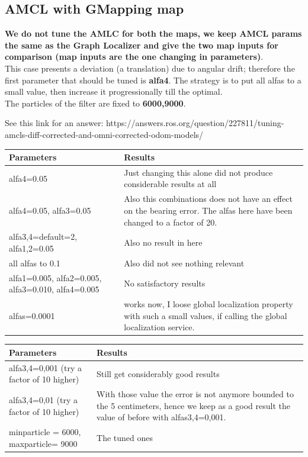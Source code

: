 \documentclass[11pt,a4paper]{article}
\begin{document}
\subsection{AMCL with GMapping map}

\textbf{We do not tune the AMLC for both the maps, we keep AMCL params the same as the Graph Localizer and give the two map inputs for comparison (map inputs are the one changing in parameters)}. \\

This case presents a deviation (a translation) due to angular drift; therefore the first parameter that should be tuned is \textbf{alfa4}. The strategy is to put all alfas to a small value, then increase it progressionally till the optimal. \\
The particles of the filter are fixed to \textbf{6000,9000}.

See this link for an answer: https://answers.ros.org/question/227811/tuning-amcls-diff-corrected-and-omni-corrected-odom-models/

\begin{center}
\begin{tabular}{| m{12em} | m{13em}|} 
\hline
\textbf{Parameters} & \textbf{Results} \\
\hline
 alfa4=0.05 &  Just changing this alone did not produce considerable results at all\\
\hline
 alfa4=0.05, alfa3=0.05 &  Also this combinations does not have an effect on the bearing error. The alfas here have been changed to a factor of 20.\\
\hline
 alfa3,4=default=2, alfa1,2=0.05 & Also no result in here \\
\hline
all alfas to 0.1 & Also did not see nothing relevant\\
\hline
alfa1=0.005, alfa2=0.005, alfa3=0.010, alfa4=0.005& No satisfactory results\\
\hline
alfas=0.0001 & works now, I loose global localization property with such a small values, if calling the global localization service. \\
\hline
\end{tabular}
\end{center}

\begin{center}
\begin{tabular}{| m{12em} | m{13em}|} 
\hline
\textbf{Parameters} & \textbf{Results} \\
\hline
alfa3,4=0,001 (try a factor of 10 higher) & Still get considerably good results \\
\hline
\hline
alfa3,4=0,01 (try a factor of 10 higher) & With those value the error is not anymore bounded to the 5 centimeters, hence we keep as a good result the value of before with alfas3,4=0,001. \\
\hline
minparticle = 6000, maxparticle= 9000 & The tuned ones\\
\hline
\end{tabular}
\end{center}
\end{document}
